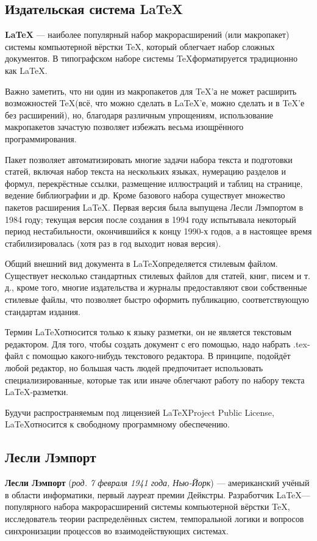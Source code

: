 \documentclass[a4paper,12pt]{article} %
\begin{document}
\subsection{Издательская система \LaTeX}
\textbf{\LaTeX} — наиболее популярный набор макрорасширений (или макропакет) системы компьютерной вёрстки \TeX , который облегчает набор сложных документов. В типографском наборе системы \TeX  форматируется традиционно как \LaTeX .

Важно заметить, что ни один из макропакетов для \TeX ’а не может расширить возможностей \TeX (всё, что можно сделать в \LaTeX ’е, можно сделать и в \TeX ’е без расширений), но, благодаря различным упрощениям, использование макропакетов зачастую позволяет избежать весьма изощрённого программирования.

Пакет позволяет автоматизировать многие задачи набора текста и подготовки статей, включая набор текста на нескольких языках, нумерацию разделов и формул, перекрёстные ссылки, размещение иллюстраций и таблиц на странице, ведение библиографии и др. Кроме базового набора существует множество пакетов расширения \LaTeX . Первая версия была выпущена Лесли Лэмпортом в 1984 году; текущая версия после создания в 1994 году испытывала некоторый период нестабильности, окончившийся к концу 1990-х годов, а в настоящее время стабилизировалась (хотя раз в год выходит новая версия).

Общий внешний вид документа в \LaTeX  определяется стилевым файлом. Существует несколько стандартных стилевых файлов для статей, книг, писем и т. д., кроме того, многие издательства и журналы предоставляют свои собственные стилевые файлы, что позволяет быстро оформить публикацию, соответствующую стандартам издания.

Термин \LaTeX относится только к языку разметки, он не является текстовым редактором. Для того, чтобы создать документ с его помощью, надо набрать .tex-файл с помощью какого-нибудь текстового редактора. В принципе, подойдёт любой редактор, но большая часть людей предпочитает использовать специализированные, которые так или иначе облегчают работу по набору текста \LaTeX -разметки.

Будучи распространяемым под лицензией \LaTeX  Project Public License, \LaTeX  относится к свободному программному обеспечению.
\subsection{Лесли Лэмпорт}
\textbf{Лесли Лэмпорт} (\textit{род. 7 февраля 1941 года, Нью-Йорк}) — американский учёный в области информатики, первый лауреат премии Дейкстры. Разработчик \LaTeX  — популярного набора макрорасширений системы компьютерной вёрстки \TeX, исследователь теории распределённых систем, темпоральной логики и вопросов синхронизации процессов во взаимодействующих системах. 
\end{document}
